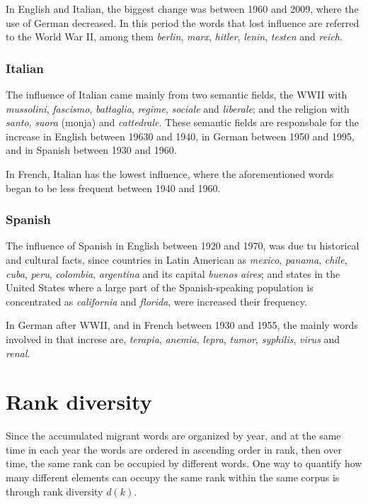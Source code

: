 \documentclass[10pt,letterpaper]{article} %
\begin{document}
In English and Italian, the biggest change was between 1960 and 2009, where the use of German decreased. In this period the words that lost influence are referred to the World War II, among them \textit{berlin}, \textit{marx}, \textit{hitler}, \textit{lenin}, \textit{testen}  and \textit{reich}.
\subsubsection*{Italian} %
 
 
The influence of Italian came mainly from two semantic fields, the WWII 
with \textit{mussolini}, \textit{fascismo}, \textit{battaglia}, \textit{regime}, \textit{sociale} and \textit{liberale}; and the religion with \textit{santo}, \textit{suora} (monja) and \textit{cattedrale}. These semantic fields are responsbale for the increase in English between 19630 and 1940, in German between 1950 and 1995, and in Spanish between 1930 and 1960.
 
In French, Italian has the lowest influence, where the aforementioned words began to be less frequent between 1940 and 1960.
\subsubsection*{Spanish} %

The influence of Spanish in English between 1920 and 1970, was due tu historical and cultural facts, since countries in Latin American as  \textit{mexico}, \textit{panama}, \textit{chile}, \textit{cuba}, \textit{peru}, \textit{colombia}, \textit{argentina} and its capital \textit{buenos} \textit{aires};  and states in the United States  where a large part of the Spanish-speaking population is concentrated as \textit{california} and \textit{florida}, were increased their frequency.

In German after WWII, and in French between 1930 and 1955, the mainly words involved in that increse are, \textit{terapia}, \textit{anemia}, \textit{lepra}, \textit{tumor}, \textit{syphilis}, \textit{virus} and \textit{renal}.

\section*{Rank diversity} %

Since the accumulated migrant words are organized by year, and at the same time in each year the words are ordered in ascending order in rank, then over time, the same rank can be occupied by different words. One way to quantify how many different elements can occupy the same rank within the same corpus is through rank diversity $d(k)$.
\end{document}
